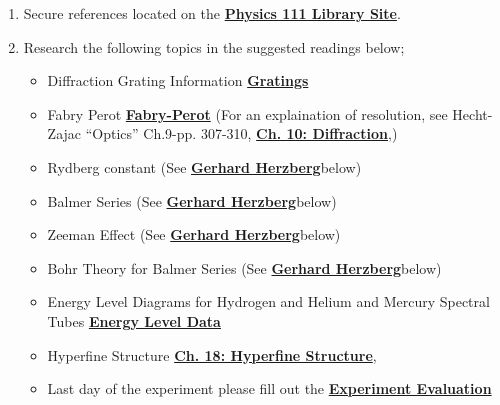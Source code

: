 \documentclass{../lab}
\begin{document}
\begin{enumerate}
    \item Secure references located on the \href{http://physics111.lib.berkeley.edu/Physics111/Reprints/ATM/ATM\_index.html}{\textbf{Physics 111 Library Site}}.

    \item Research the following topics in the suggested readings below;
    
    \begin{itemize}
        \item Diffraction Grating Information \href{http://physics111.lib.berkeley.edu/Physics111/Reprints/ATM/grating.pdf}{\textbf{Gratings}}
    
        \item Fabry Perot \href{http://physics111.lib.berkeley.edu/Physics111/Reprints/ATM/OCR\%20Burleigh\%20tech\%20memo\%20fabry\%20perots.pdf}{\textbf{Fabry-Perot}} (For an explaination of resolution, see Hecht-Zajac ``Optics'' Ch.9-pp. 307-310, \href{http://physics111.lib.berkeley.edu/Physics111/Reprints/ATM/Optics\%20Hecht\%20&\%20Zajac/Ch.\%2010\%20diffraction.pdf}{\textbf{Ch. 10: Diffraction}},)
    
        \item Rydberg constant (See \href{http://physics111.lib.berkeley.edu/Physics111/Reprints/ATM/02-2ndEd-Atomic\_Spectra\_and\_Atomic\_Structure.pdf}{\textbf{Gerhard Herzberg}}below)
    
        \item Balmer Series (See \href{http://physics111.lib.berkeley.edu/Physics111/Reprints/ATM/02-2ndEd-Atomic\_Spectra\_and\_Atomic\_Structure.pdf}{\textbf{Gerhard Herzberg}}below)
    
        \item Zeeman Effect (See \href{http://physics111.lib.berkeley.edu/Physics111/Reprints/ATM/02-2ndEd-Atomic\_Spectra\_and\_Atomic\_Structure.pdf}{\textbf{Gerhard Herzberg}}below)
    
        \item Bohr Theory for Balmer Series (See \href{http://physics111.lib.berkeley.edu/Physics111/Reprints/ATM/02-2ndEd-Atomic\_Spectra\_and\_Atomic\_Structure.pdf}{\textbf{Gerhard Herzberg}}below)
    
        \item Energy Level Diagrams for Hydrogen and Helium and Mercury Spectral Tubes \href{http://physics111.lib.berkeley.edu/Physics111/Reprints/ATM/ATM\_index.html}{\textbf{Energy Level Data}}
    
        \item Hyperfine Structure \href{http://physics111.lib.berkeley.edu/Physics111/Reprints/ATM/Introduction\%20to\%20Atomic\%20Harvey\%20E.\%20White/Ch.\%2018\%20hyperfine\%20structure\_OCR.pdf}{\textbf{Ch. 18: Hyperfine Structure}},
    
        \item Last day of the experiment please fill out the \href{\ExperimentEvaluation}{\textbf{Experiment Evaluation}}
    
    \end{itemize}
\end{enumerate}
\end{document}
